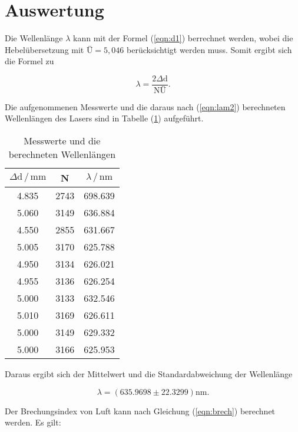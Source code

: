 \newpage
\section{Auswertung}
Die Wellenlänge $\lambda$ kann mit der Formel (\ref{eqn:d1}) berrechnet werden, 
wobei die Hebelübersetzung mit $\text{Ü}=5,046$ berücksichtigt werden muss.
Somit ergibt sich die Formel zu

\begin{equation}
\lambda=\frac{2 \Delta \text{d}}{ \text{NÜ}} .
\label{eqn:lam2}
\end{equation}

\noindent
Die aufgenommenen Messwerte und die daraus nach (\ref{eqn:lam2}) berechneten Wellenlängen des Lasers sind in Tabelle (\ref{tab:lam}) aufgeführt.

\begin{table}
    \centering
    \caption{Messwerte und die berechneten Wellenlängen}
    \label{tab:lam}
    \begin{tabular}{c c c}
    \toprule
    $ \Delta \text{d} \,/\, \si{\milli\meter} $ & N & $\lambda \,/\, \si{\nano\meter}$\\
    \midrule 
   
    4.835  & 2743 &  698.639 \\
    5.060  & 3149 &  636.884 \\
    4.550  & 2855 &  631.667 \\
    5.005  & 3170 &  625.788 \\
    4.950  & 3134 &  626.021 \\
    4.955  & 3136 &  626.254 \\
    5.000  & 3133 &  632.546 \\
    5.010  & 3169 &  626.611 \\
    5.000  & 3149 &  629.332 \\
    5.000  & 3166 &  625.953 \\

    \bottomrule
    \end{tabular}
  \end{table}

\noindent
Daraus ergibt sich der Mittelwert und die Standardabweichung der Wellenlänge

\begin{equation*}
\lambda = (635.9698 \pm 22.3299) \si{\nano\meter}.
\end{equation*}

\noindent
Der Brechungsindex von Luft kann nach Gleichung (\ref{eqn:brech}) berechnet werden.
Es gilt:


